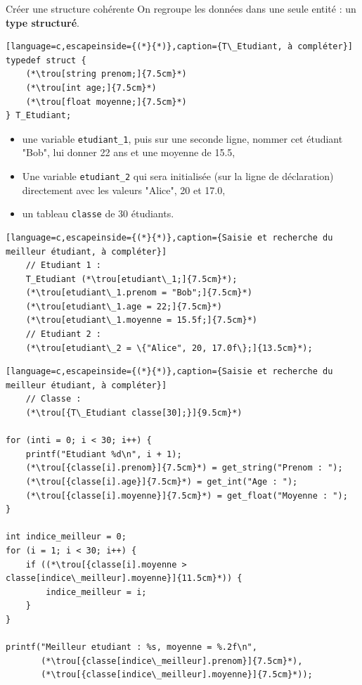 
\begin{UPSTIexercice}{Créer une structure cohérente}
    On regroupe les données dans une seule entité : un \textbf{type structuré}.
    
    \begin{lstlisting}[language=c,escapeinside={(*}{*)},caption={T\_Etudiant, à compléter}]
typedef struct {
    (*\trou[string prenom;]{7.5cm}*)
    (*\trou[int age;]{7.5cm}*)
    (*\trou[float moyenne;]{7.5cm}*)
} T_Etudiant;
\end{lstlisting}
    \begin{itemize}
        \item une variable \texttt{etudiant\_1}, puis sur une seconde ligne, nommer cet étudiant "Bob", lui donner 22 ans et une moyenne de 15.5,
        \item Une variable \texttt{etudiant\_2} qui sera initialisée (sur la ligne de déclaration) directement avec les valeurs "Alice", 20 et 17.0,
        \item un tableau \texttt{classe} de 30 étudiants.
    \end{itemize}



\begin{lstlisting}[language=c,escapeinside={(*}{*)},caption={Saisie et recherche du meilleur étudiant, à compléter}]
    // Etudiant 1 : 
    T_Etudiant (*\trou[etudiant\_1;]{7.5cm}*); 
    (*\trou[etudiant\_1.prenom = "Bob";]{7.5cm}*)
    (*\trou[etudiant\_1.age = 22;]{7.5cm}*)
    (*\trou[etudiant\_1.moyenne = 15.5f;]{7.5cm}*)
    // Etudiant 2 : 
    (*\trou[etudiant\_2 = \{"Alice", 20, 17.0f\};]{13.5cm}*); 
\end{lstlisting}
\begin{lstlisting}[language=c,escapeinside={(*}{*)},caption={Saisie et recherche du meilleur étudiant, à compléter}]
    // Classe : 
    (*\trou[{T\_Etudiant classe[30];}]{9.5cm}*) 

for (inti = 0; i < 30; i++) {
    printf("Etudiant %d\n", i + 1);
    (*\trou[{classe[i].prenom}]{7.5cm}*) = get_string("Prenom : ");
    (*\trou[{classe[i].age}]{7.5cm}*) = get_int("Age : ");
    (*\trou[{classe[i].moyenne}]{7.5cm}*) = get_float("Moyenne : ");
}

int indice_meilleur = 0;
for (i = 1; i < 30; i++) {
    if ((*\trou[{classe[i].moyenne > classe[indice\_meilleur].moyenne}]{11.5cm}*)) {
        indice_meilleur = i;
    }
}

printf("Meilleur etudiant : %s, moyenne = %.2f\n",
       (*\trou[{classe[indice\_meilleur].prenom}]{7.5cm}*),
       (*\trou[{classe[indice\_meilleur].moyenne}]{7.5cm}*));
\end{lstlisting}
\end{UPSTIexercice}

